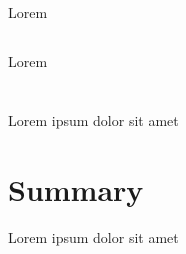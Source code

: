 \subsection{}
\begin{dummied}
    Lorem
\end{dummied}
\subsection{}
\begin{dummied}
    Lorem
\end{dummied}

\section{} \label{sec:sota_}
\begin{dummied}
    Lorem ipsum dolor sit amet
\end{dummied}



\section{Summary} \label{sec:sota_summary}
\begin{dummied}
    Lorem ipsum dolor sit amet
\end{dummied}